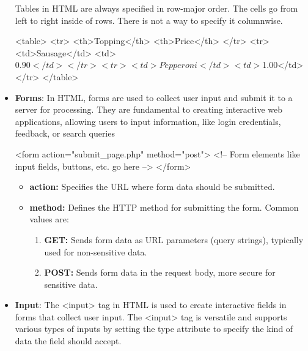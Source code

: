 \documentclass{report}
\begin{document}
\begin{itemize}
\begin{itemize}
        \end{itemize}
        Tables in HTML are always specified in row-major order. The cells go from left to right inside of rows. There is not a way to specify it columnwise.
        \bigbreak \noindent 
        \begin{htmlcode}
            <table>
                <tr>
                    <th>Topping</th>
                    <th>Price</th>
                </tr>
                <tr>
                    <td>Sausage</td>
                    <td>$0.90</td>
                </tr>
                <tr>
                    <td>Pepperoni</td>
                    <td>$1.00</td>
                </tr>
            </table>
        \end{htmlcode}
    \item \textbf{Forms}: In HTML, forms are used to collect user input and submit it to a server for processing. They are fundamental to creating interactive web applications, allowing users to input information, like login credentials, feedback, or search queries
        \bigbreak \noindent 
        \begin{htmlcode}
            <form action="submit_page.php" method="post">
                <!-- Form elements like input fields, buttons, etc. go here -->
            </form>
        \end{htmlcode}
        \begin{itemize}
            \item \textbf{action:} Specifies the URL where form data should be submitted.
            \item \textbf{method:} Defines the HTTP method for submitting the form. Common values are:
                \begin{enumerate}
                    \item \textbf{GET:} Sends form data as URL parameters (query strings), typically used for non-sensitive data.
                    \item \textbf{POST:} Sends form data in the request body, more secure for sensitive data.
                \end{enumerate}
        \end{itemize}
    \item \textbf{Input}: The <input> tag in HTML is used to create interactive fields in forms that collect user input. The <input> tag is versatile and supports various types of inputs by setting the type attribute to specify the kind of data the field should accept.
        \begin{enumerate}

\end{enumerate}
\end{itemize}
\end{document}
